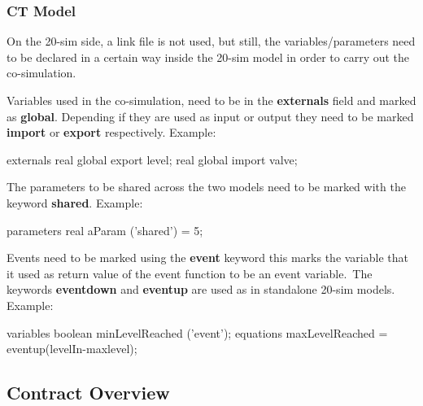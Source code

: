 \documentclass{crescendorepchap}
\newcommand{\vdmkeyw}[1]{{\bf\ttfamily #1}}
\begin{document}
\subsubsection{CT Model}

On the 20-sim side, a link file is not used, but still, the
variables/parameters need to be declared in a certain way inside the 20-sim model in order to
carry out the co-simulation.


Variables used in the co-simulation, need to be in the
\vdmkeyw{externals} field and marked as \vdmkeyw{global}. Depending if
they are used as input or output they need to be marked
\vdmkeyw{import} or \vdmkeyw{export} respectively. Example:

\begin{dcl}
externals
  real global export level;
  real global import valve;
\end{dcl}


The parameters to be shared across the two models need to be marked with
the keyword \vdmkeyw{shared}. Example:

\begin{dcl}
parameters
  real aParam ('shared') = 5; 
\end{dcl}


Events need to be marked using the \vdmkeyw{event} keyword this marks
the variable that it used as return value of the event function to be an
event variable.~The keywords \vdmkeyw{eventdown} and \vdmkeyw{eventup}
are used as in standalone 20-sim models. Example:

\begin{dcl}
variables
  boolean minLevelReached ('event');
equations
  maxLevelReached = eventup(levelIn-maxlevel);
\end{dcl}

\subsection{Contract Overview}
\end{document}
